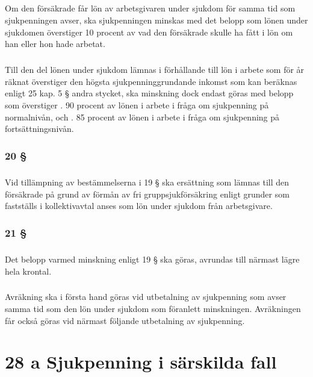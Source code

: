 \documentclass[a4paper,notitlepage,openany,10pt]{book}
\begin{document}
\paragraph*{}
Om den försäkrade får lön av arbetsgivaren under sjukdom för samma tid som sjukpenningen avser, ska sjukpenningen minskas med det belopp som lönen under sjukdomen överstiger 10 procent av vad den försäkrade skulle ha fått i lön om han eller hon hade arbetat.
\paragraph*{}
Till den del lönen under sjukdom lämnas i förhållande till lön i arbete som för år räknat överstiger den högsta sjukpenninggrundande inkomst som kan beräknas enligt 25 kap. 5 § andra stycket, ska minskning dock endast göras med belopp som överstiger
. 90 procent av lönen i arbete i fråga om sjukpenning på normalnivån, och
. 85 procent av lönen i arbete i fråga om sjukpenning på fortsättningsnivån.
\subsection*{20 §}
\paragraph*{}
Vid tillämpning av bestämmelserna i 19 § ska ersättning som lämnas till den försäkrade på grund av förmån av fri gruppsjukförsäkring enligt grunder som fastställs i kollektivavtal anses som lön under sjukdom från arbetsgivare.
\subsection*{21 §}
\paragraph*{}
Det belopp varmed minskning enligt 19 § ska göras, avrundas till närmast lägre hela krontal.
\paragraph*{}
Avräkning ska i första hand göras vid utbetalning av sjukpenning som avser samma tid som den lön under sjukdom som föranlett minskningen. Avräkningen får också göras vid närmast följande utbetalning av sjukpenning.
\chapter*{28 a Sjukpenning i särskilda fall}
\end{document}
